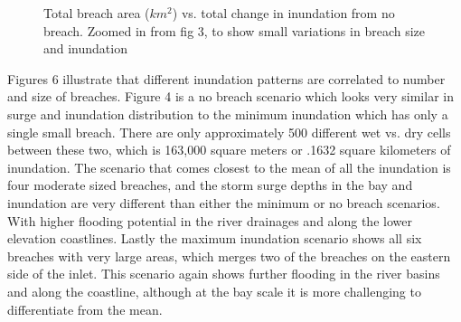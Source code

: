 \documentclass{coastal_paper}
\begin{document}
\begin{figure}
\label{fig4}
\caption{ Total breach area ($km^2$) vs. total change in inundation from no breach. Zoomed in from fig 3, to show small variations in breach size and inundation}
\end{figure}


Figures 6 illustrate that different inundation patterns are correlated to number and size of breaches. Figure 4 is a no breach scenario which looks very similar in surge and inundation distribution to the minimum inundation which has only a single small breach. There are only approximately 500 different wet vs. dry cells between these two, which is 163,000 square meters or .1632 square kilometers of inundation. The scenario that comes closest to the mean of all the inundation is four moderate sized breaches, and the storm surge depths in the bay and inundation are very different than either the minimum or no breach scenarios. With higher flooding potential in the river drainages and along the lower elevation coastlines. Lastly the maximum inundation scenario shows all six breaches with very large areas, which merges two of the breaches on the eastern side of the inlet. This scenario again shows further flooding in the river basins and along the coastline, although at the bay scale it is more challenging to differentiate from the mean.
\end{document}
